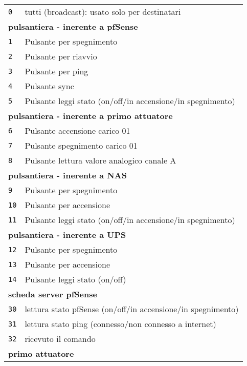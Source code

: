 \documentclass[italian]{article}
\begin{document}
        \begin{tabular}{ll}
            \texttt{0} & tutti (broadcast): usato solo per destinatari\\
            \multicolumn{2}{l}{\textbf{pulsantiera - inerente a pfSense}}\\
            \texttt{1} & Pulsante per spegnimento\\
            \texttt{2} & Pulsante per riavvio\\
            \texttt{3} & Pulsante per ping \\
            \texttt{4} & Pulsante sync \\
            \texttt{5} & Pulsante leggi stato (on/off/in accensione/in spegnimento)\\
            \multicolumn{2}{l}{\textbf{pulsantiera - inerente a primo attuatore}}\\
            \texttt{6} & Pulsante accensione carico 01\\
            \texttt{7} & Pulsante spegnimento carico 01\\
            \texttt{8} & Pulsante lettura valore analogico canale A\\
			\multicolumn{2}{l}{\textbf{pulsantiera - inerente a NAS}}\\
			\texttt{9} & Pulsante per spegnimento\\
			\texttt{10} & Pulsante per accensione\\
			\texttt{11} & Pulsante leggi stato (on/off/in accensione/in spegnimento)\\
			\multicolumn{2}{l}{\textbf{pulsantiera - inerente a UPS}}\\
			\texttt{12} & Pulsante per spegnimento\\
			\texttt{13} & Pulsante per accensione\\
			\texttt{14} & Pulsante leggi stato (on/off)\\			
            \multicolumn{2}{l}{\textbf{scheda server pfSense}}\\
            \texttt{30} & lettura stato pfSense (on/off/in accensione/in spegnimento)\\        
            \texttt{31} & lettura stato ping (connesso/non connesso a internet)\\            
            \texttt{32} & ricevuto il comando\\
            \multicolumn{2}{l}{\textbf{primo attuatore}}\\

\end{tabular}
\end{document}
